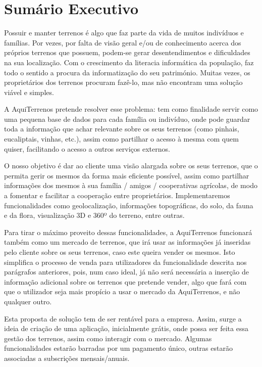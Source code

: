 \documentclass[11pt]{article}
\begin{document}
	
	
	\tableofcontents
	\pagebreak
	
	\large
	\section{Sumário Executivo}
	
	\normalsize
	
	Possuir e manter terrenos é algo que faz parte da vida de muitos indivíduos e famílias. Por vezes, por falta de visão geral e/ou de conhecimento acerca dos próprios terrenos que possuem, podem-se gerar desentendimentos e dificuldades na sua localização. Com o crescimento da literacia informática da população, faz todo o sentido a procura da informatização do seu património. Muitas vezes, os proprietários dos terrenos procuram fazê-lo, mas não encontram uma solução viável e simples.
	
	A AquiTerrenos pretende resolver esse problema: tem como finalidade servir como uma pequena base de dados para cada família ou indivíduo, onde pode guardar toda a informação que achar relevante sobre os seus terrenos (como pinhais, eucaliptais, vinhas, etc.), assim como partilhar o acesso à mesma com quem quiser, facilitando o acesso a outros serviços externos.
	
	O nosso objetivo é dar ao cliente uma visão alargada sobre os seus terrenos, que o permita gerir os mesmos da forma mais eficiente possível, assim como partilhar informações dos mesmos à sua família / amigos / cooperativas agrícolas, de modo a fomentar e facilitar a cooperação entre proprietários. Implementaremos funcionalidades como geolocalização, informações topográficas, do solo, da fauna e da flora, visualização 3D e 360º do terreno, entre outras.
	
	Para tirar o máximo proveito dessas funcionalidades, a AquiTerrenos funcionará também como um mercado de terrenos, que irá usar as informações já inseridas pelo cliente sobre os seus terrenos, caso este queira vender os mesmos. Isto simplifica o processo de venda para utilizadores da funcionalidade descrita nos parágrafos anteriores, pois, num caso ideal, já não será necessária a inserção de informação adicional sobre os terrenos que pretende vender, algo que fará com que o utilizador seja mais propício a usar o mercado da AquiTerrenos, e não qualquer outro.
	
	Esta proposta de solução tem de ser rentável para a empresa. Assim, surge a ideia de criação de uma aplicação, inicialmente grátis, onde possa ser feita essa gestão dos terrenos, assim como interagir com o mercado. Algumas funcionalidades estarão barradas por um pagamento único, outras estarão associadas a subscrições mensais/anuais.
	
\end{document}

